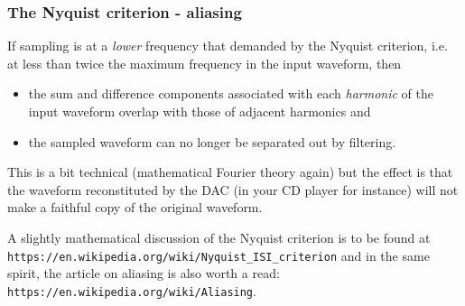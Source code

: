 \documentclass[10pt]{beamer}
\begin{document}
\begin{frame}
\frametitle{The Nyquist criterion - aliasing}
If sampling is at a \emph{lower} frequency that demanded by the Nyquist criterion, i.e. at less than twice the maximum frequency in the input waveform, then
\begin{itemize}
\item the sum and difference components associated with each \emph{harmonic} of the input waveform overlap with those of adjacent harmonics and
\item the sampled waveform can no longer be separated out by filtering.
\end{itemize}

This is a bit technical (mathematical Fourier theory again) but the effect is that the waveform reconstituted by the DAC (in your CD player for instance) will not make a faithful copy of the original waveform.

\medskip
A slightly mathematical discussion of the Nyquist criterion is to be found at \texttt{\color{blue}https://en.wikipedia.org/wiki/Nyquist\_ISI\_criterion} and in the same spirit, the article on aliasing is also worth a read: \texttt{\color{blue}https://en.wikipedia.org/wiki/Aliasing}.
\end{frame}
\end{document}
